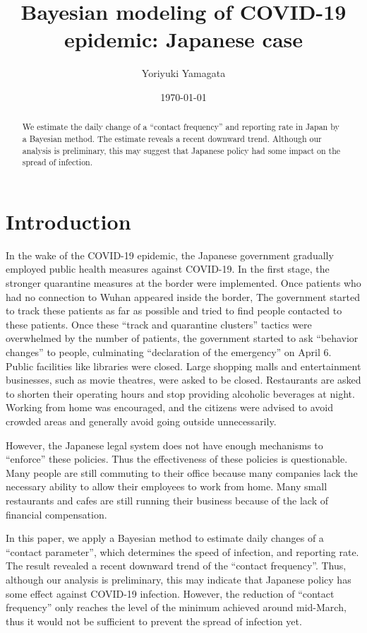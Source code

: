 \documentclass{article}
\title{Bayesian modeling of COVID-19 epidemic: Japanese case}
\author{Yoriyuki Yamagata}
\date{\today}
\begin{document}
\maketitle

\begin{abstract}
 We estimate the daily change of a ``contact frequency'' and reporting rate in Japan by a Bayesian method.
 The estimate reveals a recent downward trend.
 Although our analysis is preliminary, this may suggest that Japanese policy had some impact on the spread of infection.
\end{abstract}

\section{Introduction}

In the wake of the COVID-19 epidemic, the Japanese government gradually employed public health measures against COVID-19.
In the first stage, the stronger quarantine measures at the border were implemented.
Once patients who had no connection to Wuhan appeared inside the border, The government started to track these patients as far as possible and tried to find people contacted to these patients.
Once these ``track and quarantine clusters'' tactics were overwhelmed by the number of patients, the government started to ask ``behavior changes'' to people, culminating ``declaration of the emergency'' on April 6.
Public facilities like libraries were closed.
Large shopping malls and entertainment businesses, such as movie theatres, were asked to be closed.
Restaurants are asked to shorten their operating hours and stop providing alcoholic beverages at night.
Working from home was encouraged, and the citizens were advised to avoid crowded areas and generally avoid going outside unnecessarily.

However, the Japanese legal system does not have enough mechanisms to ``enforce'' these policies.
Thus the effectiveness of these policies is questionable.
Many people are still commuting to their office because many companies lack the necessary ability to allow their employees to work from home.
Many small restaurants and cafes are still running their business because of the lack of financial compensation.

In this paper, we apply a Bayesian method to estimate daily changes of a ``contact parameter'', which determines the speed of infection, and reporting rate.
The result revealed a recent downward trend of the ``contact frequency''.
Thus, although our analysis is preliminary, this may indicate that Japanese policy has some effect against COVID-19 infection.
However, the reduction of ``contact frequency'' only reaches the level of the minimum achieved around mid-March, thus it would not be sufficient to prevent the spread of infection yet.
\end{document}
